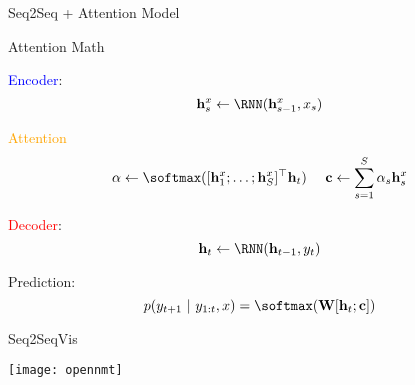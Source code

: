 \begin{frame}{Seq2Seq + Attention Model}
  \vspace{-0.25cm}

  \begin{center}
  \end{center}
\end{frame}

\begin{frame}{Attention Math}

  \textcolor{blue}{Encoder}:
  \[{\mathbf{h}^{x}_s \gets \RNN(\mathbf{h}^{x}_{s-1}, x_s)} \]


  \textcolor{orange}{Attention}
  \[\alpha \gets  \softmax(   [\mathbf{h}^{x}_1 ; \ldots; \mathbf{h}^{x}_S]^\top \mathbf{h}_{t} ) \ \ \ \ 
  {\mathbf{c}} \gets \sum_{s =1}^S \alpha_s \mathbf{h}_s^{x}  \]

  \textcolor{red}{Decoder}:
  \[{\mathbf{h}_t \gets \RNN(\mathbf{h}_{t-1}, y_t)} \]

  Prediction:
  \[ p(y_{t+1}\  |\  y_{1:t}, x) = \softmax( \mathbf{W} [\mathbf{h}_t; \mathbf{c}]) \]

\end{frame}

\begin{frame}{Seq2SeqVis}
  \vspace{-0.25cm}

  \begin{center}
  \end{center}
  
\end{frame}


\begin{frame}
  
  \begin{center}
    \texttt{[image: opennmt]}
  \end{center}

\end{frame}

